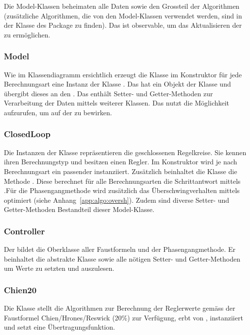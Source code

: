 Die Model-Klassen  beheimaten alle Daten  sowie den Grossteil  der Algorithmen
(zus\"atzliche Algorithmen,  die von den Model-Klassen  verwendet werden, sind
in  der  Klasse    des  Package    zu  finden). Das
  ist   observable,  um  das  Aktualisieren   der    zu
erm\"oglichen.

\subsubsection*{Model}
Wie   im   Klassendiagramm   ersichtlich  erzeugt   die   Klasse
 im Konstruktor f\"ur jede  Berechnungsart eine Instanz der Klasse
. Das  hat ein  Objekt der Klasse  und
\"ubergibt dieses an den . Das  enth\"alt Setter-
und Getter-Methoden  zur Verarbeitung der Daten  mittels weiterer Klassen. Das
 nutzt  die M\"oglichkeit   aufzurufen, um
 auf der  zu bewirken.


\subsubsection*{ClosedLoop}
Die    Instanzen   der    Klasse       repr\"asentieren   die
geschlossenen  Regelkreise. Sie  kennen   ihren  Berechnungstyp  und  besitzen
einen  Regler. Im  Konstruktor  wird  je  nach  Berechnungsart  ein  passender
   instanziiert. Zus\"atzlich  beinhaltet   die  Klasse   die
Methode  . Diese   berechnet  f\"ur   alle  Berechnungsarten
die    Schrittantwort    mittels   .F\"ur    die
Phasengangmethode   wird  zus\"atzlich   das  \"Uberschwingverhalten   mittels
 optimiert (siehe Anhang~\ref{app:algo:oversh}).
Zudem   sind   diverse   Setter-  und   Getter-Methoden   Bestandteil   dieser
Model-Klasse.


\subsubsection*{Controller}
Der    bildet  die  Oberklasse  aller  Faustformeln  und  der
Phasengangmethode. Er beinhaltet die abstrakte Klasse  sowie
alle n\"otigen Setter- und Getter-Methoden um Werte zu setzten und auszulesen.


\subsubsection*{Chien20}
Die  Klasse     stellt   die  Algorithmen  zur   Berechnung  der
Reglerwerte   gem\"ass  der   Faustformel   Chien/Hrones/Reswick  (20\%)   zur
Verf\"ugung,  erbt   von  ,   instanziiert  und   setzt  eine
\"Ubertragungsfunktion.


